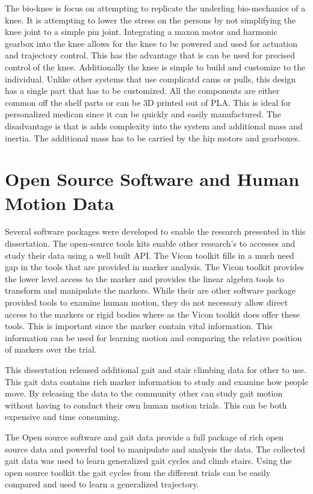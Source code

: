 The bio-knee is focus on attempting to replicate the underling bio-mechanics of a knee. It is attempting to lower the stress on the persons by not simplifying the knee joint to a simple pin joint. Integrating a maxon motor and harmonic gearbox into the knee allows for the knee to be powered and used for actuation and trajectory control. This has the advantage that is can be used for precised control of the knee. Additionally the knee is simple to build and customize to the individual. Unlike other systems that use complicatd cams or pulls, this design has a single part that has to be customized. All the components are either common off the shelf parts or can be 3D printed out of PLA. This is ideal for personalized medican since it can be quickly and easily manufactured. The disadvantage is that is adds complexity into the system and additional mass and inertia. The additional mass has to be carried by the hip motors and gearboxes.


\section{Open Source Software and Human Motion Data}

Several software packages were developed to enable the research presented in this dissertation. The open-source tools kits enable other research's to accesses and study their data using a well built API. The Vicon toolkit fills in a much need gap in the tools that are provided in marker analysis. The Vicon toolkit provides the lower level access to the marker and provides the linear algebra tools to transform and manipulate the markers. While their are other software package provided tools to examine human motion, they do not necessary allow direct access to the markers or rigid bodies where as the Vicon toolkit does offer these tools. This is important since the marker contain vital information. This information can be used for learning motion and comparing the relative position of markers over the trial. 

This dissertation released additional gait and stair climbing data for other to use. This gait data contains rich marker information to study and examine how people move. By releasing the data to the community other can study gait motion without having to conduct their own human motion trials. This can be both expensive and time consuming. 

The Open source software and gait data provide a full package of rich open source data and powerful tool to manipulate and analysis the data. The collected gait data was used to learn generalized gait cycles and climb stairs. Using the open source toolkit the gait cycles from the different trials can be easily compared and used to learn a generalized trajectory. 


